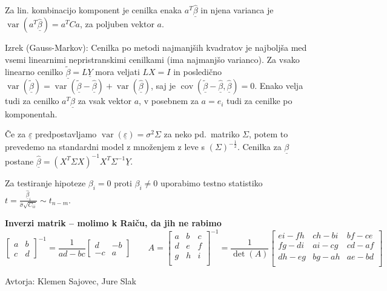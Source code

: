 \documentclass[11pt,a4paper]{amsart}
\theoremstyle{definition} %
\theoremstyle{plain} %
\newcommand{\Y}{\underline{Y}}
\newcommand{\ubeta}{\ensuremath{\underline{\beta}}}
\newcommand{\ueps}{\ensuremath{\underline{\varepsilon}}}
\DeclareMathOperator{\cov}{cov}
\DeclareMathOperator{\var}{var}
\begin{document}
Za lin. kombinacijo komponent je cenilka enaka $a^T\hat{\ubeta}$ in njena
varianca je $\var(a^T\hat{\ubeta}) = a^T C a$, za poljuben vektor $a$.

Izrek (Gauss-Markov): Cenilka po metodi najmanjših kvadratov je najboljša med
vsemi linearnimi nepristranskimi cenilkami (ima najmanjšo varianco). Za vsako
linearno cenilko $\tilde{\ubeta} = L\Y$ mora veljati $LX = I$ in posledično
$\var(\tilde{\ubeta}) = \var(\tilde{\ubeta} - \hat{\ubeta}) +
\var(\hat{\ubeta})$, saj je $\cov(\tilde{\ubeta} - \hat{\ubeta}, \hat{\ubeta}) =
0$. Enako velja tudi za cenilko $a^T\hat{\ubeta}$ za vsak vektor $a$, v posebnem
za $a = e_i$ tudi za cenilke po komponentah.

Če za $\ueps$ predpostavljamo $\var(\ueps) = \sigma^2\Sigma$ za neko pd.\
matriko $\Sigma$, potem to prevedemo na standardni model z množenjem z leve s
$(\Sigma)^{-\frac12}$. Cenilka za $\ubeta$ postane $\hat{\ubeta} =
(X^T\Sigma X)^{-1}X^T\Sigma^{-1} \Y$.

Za testiranje hipoteze $\beta_i = 0$ proti $\beta_i \neq 0$ uporabimo testno
statistiko $t = \frac{\hat{\ubeta}_i}{\hat{\sigma} \sqrt{C_{ii}}} \sim t_{n-m}$.

\textbf{Inverzi matrik -- molimo k Raiču, da jih ne rabimo}
\[
  \begin{bmatrix}
    a & b \\ c & d
  \end{bmatrix}^{-1}
  =
  \frac{1}{ad - bc}
  \begin{bmatrix}
    d & -b \\ -c & a
  \end{bmatrix}
  \qquad A =
  \begin{bmatrix}
    a & b & c \\
    d & e & f \\
    g & h & i \\
  \end{bmatrix}^{-1}
 =
  \frac{1}{\det(A)}
\begin{bmatrix}
e i-f h & c h-b i & b f-c e \\
f g-d i & a i-c g & c d-a f \\
d h-e g & b g-a h & a e-b d \\
\end{bmatrix}
\]


\vfill \hfill Avtorja: Klemen Sajovec, Jure Slak
\end{document}
